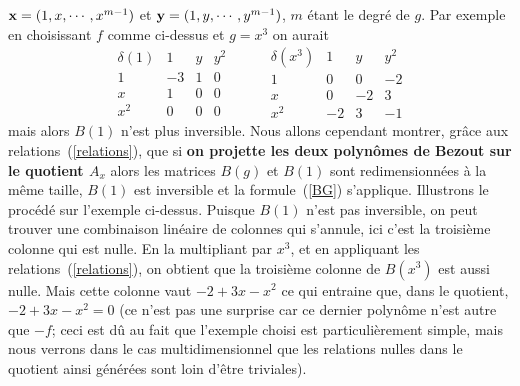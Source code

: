 \documentclass{standalone}
\begin{document}
$\bold{x} = (1, x,\cdots, x^{m-1})$ et $\bold{y} = (1, y,\cdots, y^{m-1})$, $m$ étant le degré de $g$. Par exemple en choisissant $f$ comme ci-dessus et $g = x^3$ on aurait
$$
\begin{array}{c|ccc}
\delta(1) & 1 & y & y^2\\
\hline
1 & -3 & 1 & 0\\
x & 1 & 0 & 0\\
x^2 & 0 & 0 & 0
\end{array}
\hspace{1cm}
\begin{array}{c|ccc}
\delta(x^3) & 1 & y & y^2\\
\hline
1 & 0 & 0 & -2\\
x & 0 & -2 & 3\\
x^2 & -2 & 3 & -1
\end{array}
$$
mais alors $B(1)$ n'est plus inversible. Nous allons cependant montrer, grâce aux relations~(\ref{relations}), que si {\bf on projette les deux polynômes de Bezout sur le quotient $A_x$} alors les matrices $B(g)$ et $B(1)$ sont redimensionnées à la même taille, $B(1)$ est inversible et la formule~(\ref{BG}) s'applique. Illustrons le procédé sur l'exemple ci-dessus. Puisque $B(1)$ n'est pas inversible, on peut trouver une combinaison linéaire de colonnes qui s'annule, ici c'est la troisième colonne qui est nulle. En la multipliant par $x^3$, et en appliquant les relations~(\ref{relations}), on obtient que la troisième colonne de $B(x^3)$ est aussi nulle. Mais cette colonne vaut $-2 + 3x - x^2$ ce qui entraine que, dans le quotient,
$-2 + 3x - x^2 = 0$ (ce n'est pas une surprise car ce dernier polynôme n'est autre que $-f$; ceci est dû au fait que l'exemple choisi est particulièrement simple, mais nous verrons dans le cas multidimensionnel que les relations nulles dans le quotient ainsi générées sont loin d'être triviales).
\end{document}
